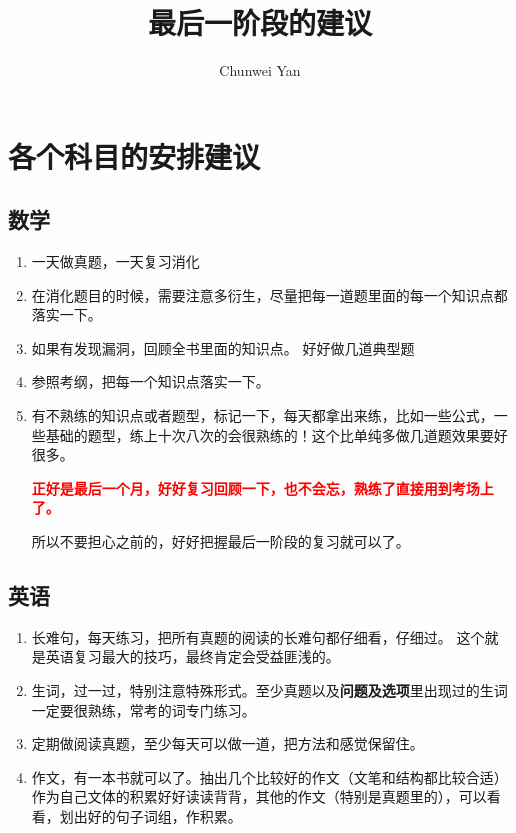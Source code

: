 \documentclass[a4paper]{ctexart}
\author{Chunwei Yan}
\title{最后一阶段的建议}
\begin{document}
    \maketitle
\section{各个科目的安排建议}

\subsection{数学}
\begin{enumerate}
    \item 一天做真题，一天复习消化
    \item 在消化题目的时候，需要注意多衍生，尽量把每一道题里面的每一个知识点都落实一下。
    \item 如果有发现漏洞，回顾全书里面的知识点。 好好做几道典型题
    \item 参照考纲，把每一个知识点落实一下。
    \item 有不熟练的知识点或者题型，标记一下，每天都拿出来练，比如一些公式，一些基础的题型，练上十次八次的会很熟练的！这个比单纯多做几道题效果要好很多。
    \par
    \textbf{\textcolor{red}{正好是最后一个月，好好复习回顾一下，也不会忘，熟练了直接用到考场上了。}}
    \par 所以不要担心之前的，好好把握最后一阶段的复习就可以了。
\end{enumerate}

\subsection{英语}
\begin{enumerate}
    \item 长难句，每天练习，把所有真题的阅读的长难句都仔细看，仔细过。 这个就是英语复习最大的技巧，最终肯定会受益匪浅的。
    \item 生词，过一过，特别注意特殊形式。至少真题以及\textbf{问题及选项}里出现过的生词一定要很熟练，常考的词专门练习。
    \item 定期做阅读真题，至少每天可以做一道，把方法和感觉保留住。
    \item 作文，有一本书就可以了。抽出几个比较好的作文（文笔和结构都比较合适）作为自己文体的积累好好读读背背，其他的作文（特别是真题里的），可以看看，划出好的句子词组，作积累。
\end{enumerate}
\end{document}
